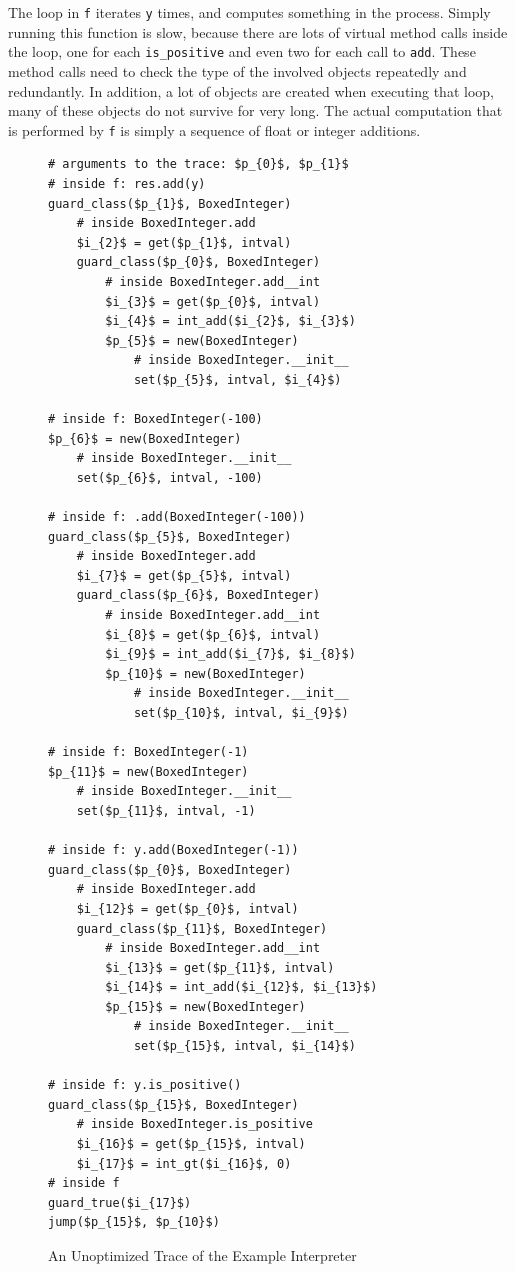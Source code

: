 \documentclass[preprint]{sigplanconf}
\begin{document}
The loop in \lstinline{f} iterates \lstinline{y} times, and computes something in the process.
Simply running this function is slow, because there are lots of virtual method
calls inside the loop, one for each \lstinline{is_positive} and even two for each
call to \lstinline{add}. These method calls need to check the type of the involved
objects repeatedly and redundantly. In addition, a lot of objects are created
when executing that loop, many of these objects do not survive for very long.
The actual computation that is performed by \lstinline{f} is simply a sequence of
float or integer additions.


\begin{figure}
\begin{lstlisting}[mathescape]
# arguments to the trace: $p_{0}$, $p_{1}$
# inside f: res.add(y)
guard_class($p_{1}$, BoxedInteger)
    # inside BoxedInteger.add
    $i_{2}$ = get($p_{1}$, intval)
    guard_class($p_{0}$, BoxedInteger)
        # inside BoxedInteger.add__int
        $i_{3}$ = get($p_{0}$, intval)
        $i_{4}$ = int_add($i_{2}$, $i_{3}$)
        $p_{5}$ = new(BoxedInteger)
            # inside BoxedInteger.__init__
            set($p_{5}$, intval, $i_{4}$)

# inside f: BoxedInteger(-100) 
$p_{6}$ = new(BoxedInteger)
    # inside BoxedInteger.__init__
    set($p_{6}$, intval, -100)

# inside f: .add(BoxedInteger(-100))
guard_class($p_{5}$, BoxedInteger)
    # inside BoxedInteger.add
    $i_{7}$ = get($p_{5}$, intval)
    guard_class($p_{6}$, BoxedInteger)
        # inside BoxedInteger.add__int
        $i_{8}$ = get($p_{6}$, intval)
        $i_{9}$ = int_add($i_{7}$, $i_{8}$)
        $p_{10}$ = new(BoxedInteger)
            # inside BoxedInteger.__init__
            set($p_{10}$, intval, $i_{9}$)

# inside f: BoxedInteger(-1)
$p_{11}$ = new(BoxedInteger)
    # inside BoxedInteger.__init__
    set($p_{11}$, intval, -1)

# inside f: y.add(BoxedInteger(-1))
guard_class($p_{0}$, BoxedInteger)
    # inside BoxedInteger.add
    $i_{12}$ = get($p_{0}$, intval)
    guard_class($p_{11}$, BoxedInteger)
        # inside BoxedInteger.add__int
        $i_{13}$ = get($p_{11}$, intval)
        $i_{14}$ = int_add($i_{12}$, $i_{13}$)
        $p_{15}$ = new(BoxedInteger)
            # inside BoxedInteger.__init__
            set($p_{15}$, intval, $i_{14}$)

# inside f: y.is_positive()
guard_class($p_{15}$, BoxedInteger)
    # inside BoxedInteger.is_positive
    $i_{16}$ = get($p_{15}$, intval)
    $i_{17}$ = int_gt($i_{16}$, 0)
# inside f
guard_true($i_{17}$)
jump($p_{15}$, $p_{10}$)
\end{lstlisting}
\caption{An Unoptimized Trace of the Example Interpreter}
\label{fig:unopt-trace}
\end{figure}
\end{document}
